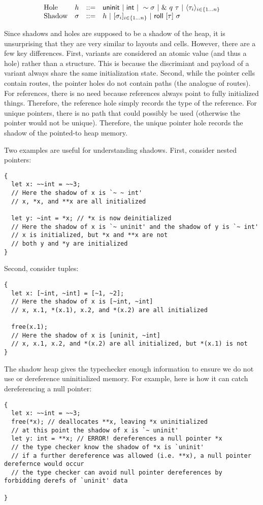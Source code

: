 \[
\begin{array}{lccl}
\textrm{Hole} & h & ::= & \mathsf{uninit} ~|~ \mathsf{int} ~|~ \sim{\sigma} 
				      ~|~ \&~{{q}~{\tau}} ~|~ \langle{{\tau}_{i}}\rangle_{{i} \in \{1 \ldots {n}\} } \\
\textrm{Shadow} & \sigma & ::= & h ~|~ [{{\sigma}_{i}}]_{{i} \in \{1 \ldots {n}\} } ~|~ \mathsf{roll}~[{\tau}]~{\sigma} \\
\end{array}
\]

Since shadows and holes are supposed to be a shadow of the heap,
it is unsurprising that they are very similar to layouts and cells.
However, there are a few key differences.
First, variants are considered an atomic value (and thus a hole) rather than
a structure. This is because the discrimiant and payload of a variant always
share the same initialization state.
Second, while the pointer cells contain routes, the pointer holes do not
contain paths (the analogue of routes).
For references, there is no need because references always point to fully initialized things.
Therefore, the reference hole simply records the type of the reference.
For unique pointers, there is no path that could possibly be used
(otherwise the pointer would not be unique).
Therefore, the unique pointer hole records the shadow of the pointed-to heap memory.

Two examples are useful for understanding shadows.
First, consider nested pointers:
\begin{verbatim}
{
  let x: ~~int = ~~3;
  // Here the shadow of x is `~ ~ int'
  // x, *x, and **x are all initialized

  let y: ~int = *x; // *x is now deinitialized
  // Here the shadow of x is `~ uninit' and the shadow of y is `~ int'
  // x is initialized, but *x and **x are not
  // both y and *y are initialized
}
\end{verbatim}

Second, consider tuples:
\begin{verbatim}
{
  let x: [~int, ~int] = [~1, ~2];
  // Here the shadow of x is [~int, ~int]
  // x, x.1, *(x.1), x.2, and *(x.2) are all initialized

  free(x.1);
  // Here the shadow of x is [uninit, ~int]
  // x, x.1, x.2, and *(x.2) are all initialized, but *(x.1) is not
}
\end{verbatim}

The shadow heap gives the typechecker enough information 
to ensure we do not use or dereference uninitialized memory.
For example, here is how it can catch dereferencing a null pointer:
\begin{verbatim}
{
  let x: ~~int = ~~3;
  free(*x); // deallocates **x, leaving *x uninitialized
  // at this point the shadow of x is `~ uninit'
  let y: int = **x; // ERROR! dereferences a null pointer *x
  // the type checker know the shadow of *x is `uninit'
  // if a further dereference was allowed (i.e. **x), a null pointer derefernce would occur
  // the type checker can avoid null pointer dereferences by forbidding derefs of `uninit' data

}
\end{verbatim}

